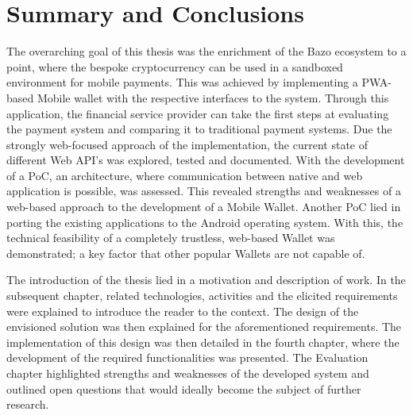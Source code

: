 \chapter{Summary and Conclusions}

The overarching goal of this thesis was the enrichment of the Bazo ecosystem to a point, where the bespoke cryptocurrency can be used in a sandboxed environment for mobile payments. This was achieved by implementing a PWA-based Mobile wallet with the respective interfaces to the system. Through this application, the financial service provider can take the first steps at evaluating the payment system and comparing it to traditional payment systems. Due the strongly web-focused approach of the implementation, the current state of different Web API's was explored, tested and documented. With the development of a PoC, an architecture, where communication between native and web application is possible, was assessed. This revealed strengths and weaknesses of a web-based approach to the development of a Mobile Wallet. Another PoC lied in porting the existing applications to the Android operating system. With this, the technical feasibility of a completely trustless, web-based Wallet was demonstrated; a key factor that other popular Wallets are not capable of.

The introduction of the thesis lied in a motivation and description of work. In the subsequent chapter, related technologies, activities and the elicited requirements were explained to introduce the reader to the context. The design of the envisioned solution was then explained for the aforementioned requirements. The implementation of this design was then detailed in the fourth chapter, where the development of the required functionalities was presented. The Evaluation chapter highlighted strengths and weaknesses of the developed system and outlined open questions that would ideally become the subject of further research.
